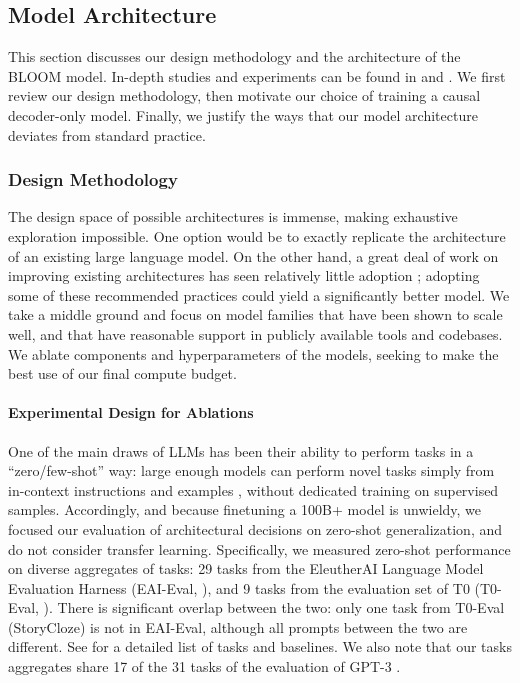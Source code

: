 \documentclass[twoside,11pt]{article}
\begin{document}
\subsection{Model Architecture}
\label{sec:modeling}

This section discusses our design methodology and the architecture of the BLOOM model. 
In-depth studies and experiments can be found in \citet{scao2022what} and \citet{wang2022what}. We first review our design methodology, then motivate our choice of training a causal decoder-only model. Finally, we justify the ways that our model architecture deviates from standard practice.

\subsubsection{Design Methodology}

The design space of possible architectures is immense, making exhaustive exploration impossible.
One option would be to exactly replicate the architecture of an existing large language model.
On the other hand, a great deal of work on improving existing architectures has seen relatively little adoption \citep{narang2021transformer}; adopting some of these recommended practices could yield a significantly better model.
We take a middle ground and focus on model families that have been shown to scale well, and that have reasonable support in publicly available tools and codebases. We ablate components and hyperparameters of the models, seeking to make the best use of our final compute budget.

\paragraph{Experimental Design for Ablations}

One of the main draws of LLMs has been their ability to perform tasks in a ``zero/few-shot'' way: large enough models can perform novel tasks simply from in-context instructions and examples \citep{radford2019language}, without dedicated training on supervised samples. Accordingly, and because finetuning a 100B+ model is unwieldy, we focused our evaluation of architectural decisions on zero-shot generalization, and do not consider transfer learning. Specifically, we measured zero-shot performance on diverse aggregates of tasks: 29 tasks from the EleutherAI Language Model Evaluation Harness (EAI-Eval, \cite{eval-harness}), and 9 tasks from the evaluation set of T0 (T0-Eval, \cite{sanh2022multitask}). There is significant overlap between the two: only one task from T0-Eval (StoryCloze) is not in EAI-Eval, although all prompts between the two are different. See \citet{scao2022what} for a detailed list of tasks and baselines.
We also note that our tasks aggregates share 17 of the 31 tasks of the evaluation of GPT-3 \citep{brown2020language}.
\end{document}
